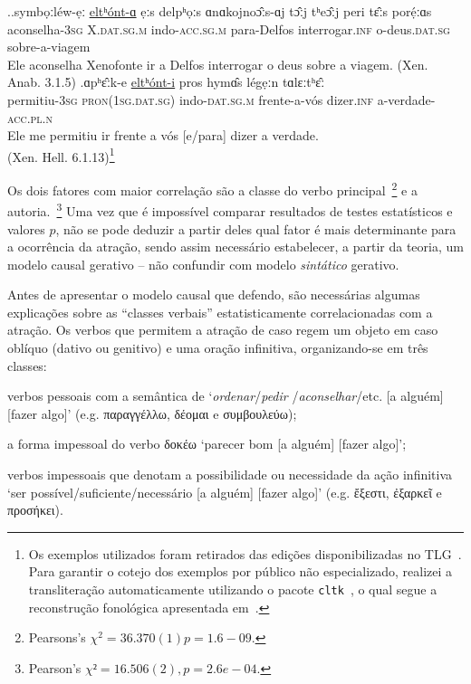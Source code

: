 \documentclass[a4paper,article,12pt,oneside]{memoir}
\begin{document}
\ex.\label{gloss:attrac}\ag.\label{elthonta}symbọːléw-ẹː  \uline{eltʰónt-ɑ} {ẹːs delpʰọːs} ɑnɑkojnoɔ̂ːs-ɑj {tɔ̂ːj tʰeɔ̂ːj} {peri tɛ̂ːs porẹ́ːɑs}\\
aconselha-\textsc{3sg} X.\textsc{dat.sg.m} indo-\textsc{acc.sg.m} para-Delfos interrogar.\textsc{inf} o-deus.\textsc{dat.sg} sobre-a-viagem\\
Ele aconselha Xenofonte ir a Delfos interrogar o deus sobre a viagem. (Xen. Anab. 3.1.5)
\bg.\label{elthonti}ɑpʰɛ̂ːk-e  \uline{eltʰónt-i} {pros hymɑ̂s} légẹːn tɑlɛːtʰɛ̂ː\\
permitiu-\textsc{3sg} \textsc{pron{(1sg.dat.sg)}} indo-\textsc{dat.sg.m} frente-a-vós dizer.\textsc{inf} a-verdade-\textsc{acc.pl.n}\\
Ele me permitiu ir frente a vós [e\slash{}para] dizer a verdade.\\(Xen. Hell. 6.1.13)\footnote{Os exemplos utilizados foram retirados das edições disponibilizadas no TLG~\cite{tlg}. Para garantir o cotejo dos exemplos por público não especializado, realizei a transliteração automaticamente utilizando o pacote \texttt{cltk}~\cite{cltk}, o qual segue a reconstrução fonológica apresentada em~\textcite{Probert2010}.}

Os dois fatores com maior correlação são a classe do verbo principal~\footnote{Pearsons's $\chi^2 = 36.370 (1) p = 1.6-09$.} e a autoria.~\footnote{Pearson’s $\chi² = 16.506 (2), p =2.6e-04$.}
Uma vez que é impossível comparar resultados de testes estatísticos e valores $p$, não se pode deduzir a partir deles qual fator é mais determinante para a ocorrência da atração, sendo assim necessário estabelecer, a partir da teoria, um modelo causal gerativo -- não confundir com modelo \emph{sintático} gerativo.

Antes de apresentar o modelo causal que defendo, são necessárias algumas explicações sobre as ``classes verbais'' estatisticamente correlacionadas com a atração.
Os verbos que permitem a atração de caso regem um objeto em caso oblíquo (dativo ou genitivo) e uma oração infinitiva, organizando-se em três classes:
\begin{compactenum}
	\item verbos pessoais com a semântica de `\emph{ordenar}\slash{}\emph{pedir} \slash{}\emph{aconselhar}\slash{}etc. [a alguém] [fazer algo]' (e.g. παραγγέλλω, δέομαι e συμβουλεύω);
	\item a forma impessoal do verbo δοκέω `parecer bom [a alguém] [fazer algo]';
	\item verbos impessoais que denotam a possibilidade ou necessidade da ação infinitiva `ser possível\slash{}suficiente\slash{}necessário [a alguém] [fazer algo]' (e.g. ἔξεστι, ἐξαρκεῖ e προσήκει).
\end{compactenum}
\end{document}
